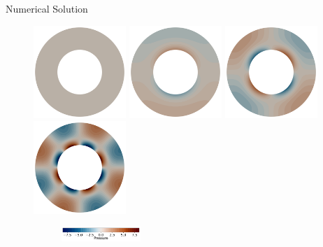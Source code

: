 \documentclass[10pt,aspectratio=169]{beamer}
\begin{document}
\begin{frame}{Numerical Solution}
	\begin{figure}[!htb]
		\vspace{-0.5in}
		\begin{multicols}{4}
			\includegraphics[width=3.5cm]{./model_k_0_res_32_vdeg_2_pdeg_1_pcont_True_vel_penalty_1.0e+08_stokes_tol_1.0e-10/p_uw.png}\par
			\hspace{0.75in}
			\includegraphics[width=3.5cm]{./model_k_1_res_32_vdeg_2_pdeg_1_pcont_True_vel_penalty_1.0e+08_stokes_tol_1.0e-10/p_uw.png}\par
			\hspace{1.5in}
			\includegraphics[width=3.5cm]{./model_k_2_res_32_vdeg_2_pdeg_1_pcont_True_vel_penalty_1.0e+08_stokes_tol_1.0e-10/p_uw.png}\par
			\hspace{2.25in}
			\includegraphics[width=3.5cm]{./model_k_4_res_32_vdeg_2_pdeg_1_pcont_True_vel_penalty_1.0e+08_stokes_tol_1.0e-10/p_uw.png}
		\end{multicols}
		\vspace{-0.27in}
		\begin{figure}
			\hspace{0.1in} 
			\includegraphics[width=3cm]{./model_k_0_res_32_vdeg_2_pdeg_1_pcont_True_vel_penalty_1.0e+08_stokes_tol_1.0e-10/p_ana_cbhorz.pdf}
		\end{figure}
	\end{figure}
\end{frame}
\end{document}
